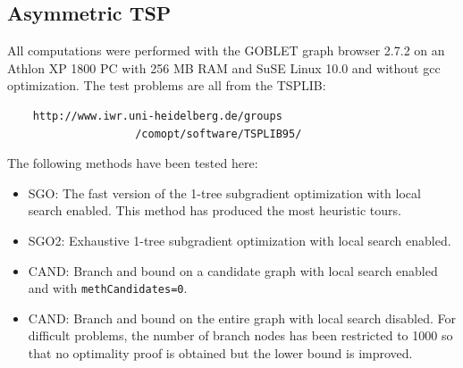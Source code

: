 \documentclass[a4paper,11pt,twoside]{book}
\begin{document}
\begin{multicols}{2}
\section{Asymmetric TSP}
All computations were performed with the GOBLET graph browser 2.7.2 on an
Athlon XP 1800 PC with 256 MB RAM and SuSE Linux 10.0 and without gcc optimization.
The test problems are all from the TSPLIB:
\begin{verbatim}
    http://www.iwr.uni-heidelberg.de/groups
                    /comopt/software/TSPLIB95/
\end{verbatim}
The following methods have been tested here:
\begin{itemize}
\item SGO: The fast version of the 1-tree subgradient optimization
    with local search enabled. This method has produced the most heuristic
    tours.
\item SGO2: Exhaustive 1-tree subgradient optimization with local
    search enabled.
\item CAND: Branch and bound on a candidate graph with
    local search enabled and with \verb/methCandidates=0/.
\item CAND: Branch and bound on the entire graph with local search
    disabled. For difficult problems, the number of branch nodes has been
    restricted to 1000 so that no optimality proof is obtained but the lower
    bound is improved.
\end{itemize}



\end{multicols}
\end{document}
